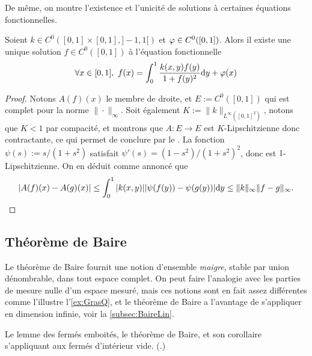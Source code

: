De même, on montre l'existence et l'unicité de solutions à certaines équations fonctionnelles. 
\begin{exemple}
\label{ex:eqFunctIntegr}
%
	Soient $k \in C^0([0,1]\times [0,1],]-1,1[)$ et $\varphi \in C^0([0,1])$. Alors il existe une unique solution $f\in C^0([0,1])$ à l'équation fonctionnelle
	\begin{equation*}
		 \forall x \in [0,1],\ f (x) = \int_0^1 \frac{k(x,y) f(y)}{1+f(y)^2} \mathrm{d} y + \varphi(x)
	\end{equation*}
\end{exemple}

\begin{proof}
	Notons $A(f)(x)$ le membre de droite, et $E := C^0([0,1])$ qui est complet pour la norme $\|\cdot\|_\infty$. 
	Soit également $K := \|k\|_{L^\infty([0,1]^2)}$, notons que $K<1$ par compacité, et montrons que $A : E \to E$ est $K$-Lipschitzienne donc contractante, ce qui permet de conclure par le . 
	La fonction $\psi(s):= s/(1+s^2)$ satisfait $\psi'(s) = (1-s^2)/(1+s^2)^2$, donc est $1$-Lipschitzienne. On en déduit comme annoncé que 
	\begin{equation*}
		| A(f)(x)-A(g)(x)| \leq \int_0^1 |k(x,y)| |\psi(f(y))-\psi(g(y))| \mathrm{d} y 
		\leq \|k\|_\infty \|f-g\|_\infty.
		\qedhere
	\end{equation*} 	
\end{proof}


\subsection{Théorème de Baire}
\label{subsec:Baire}

Le théorème de Baire fournit une notion d'ensemble \emph{maigre}, stable par union dénombrable, dans tout espace complet. On peut faire l'analogie avec les parties de mesure nulle d'un espace mesuré, mais ces notions sont en fait assez différentes comme l'illustre l'\cref{ex:GrasQ}, et le théorème de Baire a l'avantage de s'appliquer en dimension infinie, voir la \cref{subsec:BaireLin}.

\begin{retenir}
Le lemme des fermés emboités, le théorème de Baire, et son corollaire s'appliquant aux fermés d'intérieur vide. 
(.)	
\end{retenir}



